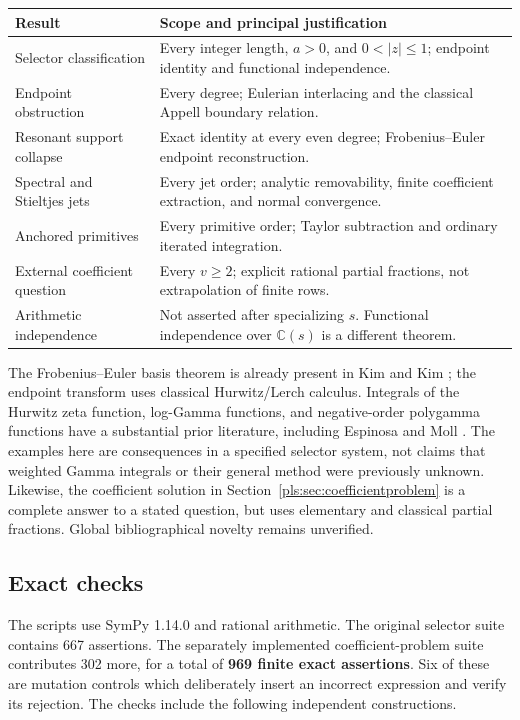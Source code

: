 \documentclass[11pt,letterpaper]{article}
\numberwithin{equation}{section}
\theoremstyle{definition}
\theoremstyle{remark}\newtheorem{remark}[theorem]{Remark}
\newcommand{\C}{\mathbb C}\newcommand{\Q}{\mathbb Q}
\begin{document}
\begin{center}
\small
\begin{tabular}{@{}p{}p{}@{}}
\toprule
Result & Scope and principal justification\\
\midrule
Selector classification & Every integer length, $a>0$, and
$0<|z|\le1$; endpoint identity and functional independence.\\
Endpoint obstruction & Every degree; Eulerian interlacing and the
classical Appell boundary relation.\\
Resonant support collapse & Exact identity at every even degree;
Frobenius--Euler endpoint reconstruction.\\
Spectral and Stieltjes jets & Every jet order; analytic removability,
finite coefficient extraction, and normal convergence.\\
Anchored primitives & Every primitive order; Taylor subtraction and
ordinary iterated integration.\\
External coefficient question & Every $v\ge2$; explicit rational
partial fractions, not extrapolation of finite rows.\\
Arithmetic independence & Not asserted after specializing $s$.
Functional independence over $\C(s)$ is a different theorem.\\
\bottomrule
\end{tabular}
\end{center}

The Frobenius--Euler basis theorem is already present in Kim and Kim
\cite{KimKim}; the endpoint transform uses classical Hurwitz/Lerch
calculus. Integrals of the Hurwitz zeta function, log-Gamma functions,
and negative-order polygamma functions have a substantial prior
literature, including Espinosa and Moll \cite{EM1,EM2}. The examples
here are consequences in a specified selector system, not claims that
weighted Gamma integrals or their general method were previously
unknown. Likewise, the coefficient solution in
Section~\ref{pls:sec:coefficientproblem} is a complete answer to a
stated question, but uses elementary and classical partial fractions.
Global bibliographical novelty remains unverified.

\subsection{Exact checks}

The scripts use SymPy 1.14.0 and rational arithmetic. The original
selector suite contains 667 assertions. The separately implemented
coefficient-problem suite contributes 302 more, for a total of
\textbf{969 finite exact assertions}. Six of these are mutation controls
which deliberately insert an incorrect expression and verify its
rejection. The checks include the following independent constructions.
\end{document}
